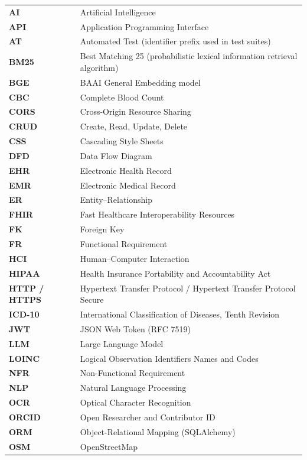 \begin{longtable}{@{}p{} p{}@{}}
\textbf{AI} & Artificial Intelligence \\
\textbf{API} & Application Programming Interface \\
\textbf{AT} & Automated Test (identifier prefix used in test suites) \\
\textbf{BM25} & Best Matching 25 (probabilistic lexical information retrieval algorithm) \\
\textbf{BGE} & BAAI General Embedding model \\
\textbf{CBC} & Complete Blood Count \\
\textbf{CORS} & Cross-Origin Resource Sharing \\
\textbf{CRUD} & Create, Read, Update, Delete \\
\textbf{CSS} & Cascading Style Sheets \\
\textbf{DFD} & Data Flow Diagram \\
\textbf{EHR} & Electronic Health Record \\
\textbf{EMR} & Electronic Medical Record \\
\textbf{ER} & Entity--Relationship \\
\textbf{FHIR} & Fast Healthcare Interoperability Resources \\
\textbf{FK} & Foreign Key \\
\textbf{FR} & Functional Requirement \\
\textbf{HCI} & Human--Computer Interaction \\
\textbf{HIPAA} & Health Insurance Portability and Accountability Act \\
\textbf{HTTP / HTTPS} & Hypertext Transfer Protocol / Hypertext Transfer Protocol Secure \\
\textbf{ICD-10} & International Classification of Diseases, Tenth Revision \\
\textbf{JWT} & JSON Web Token (RFC 7519) \\
\textbf{LLM} & Large Language Model \\
\textbf{LOINC} & Logical Observation Identifiers Names and Codes \\
\textbf{NFR} & Non-Functional Requirement \\
\textbf{NLP} & Natural Language Processing \\
\textbf{OCR} & Optical Character Recognition \\
\textbf{ORCID} & Open Researcher and Contributor ID \\
\textbf{ORM} & Object-Relational Mapping (SQLAlchemy) \\
\textbf{OSM} & OpenStreetMap \\

\end{longtable}
